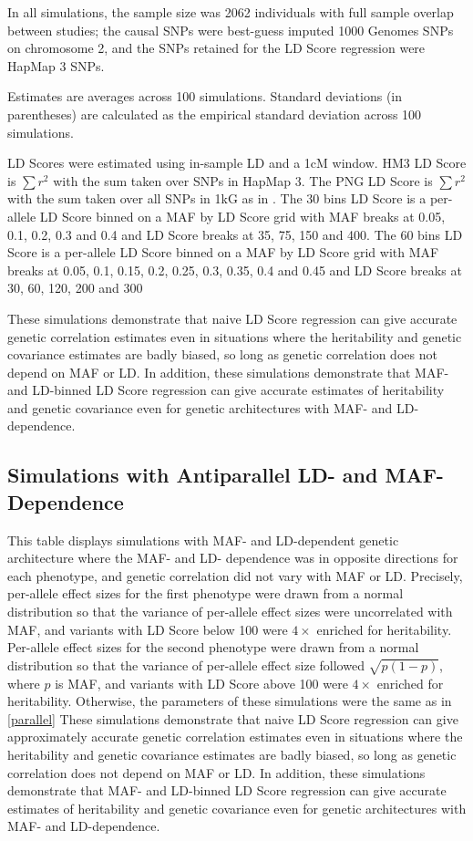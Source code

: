 \documentclass[11pt]{article}
\numberwithin{equation}{section}
\numberwithin{definition}{section}
\numberwithin{thm}{section}
\numberwithin{lemma}{section}
\numberwithin{prop}{section}
\numberwithin{cor}{section}
\numberwithin{hyp}{section}
\begin{document}
In all simulations, the sample size was 2062 individuals with full sample overlap between studies; the causal SNPs were best-guess imputed 1000 Genomes SNPs on chromosome 2, and the SNPs retained for the LD Score regression were HapMap 3 SNPs. 

Estimates are averages across 100 simulations. Standard deviations (in parentheses) are calculated as the empirical standard deviation across 100 simulations.

LD Scores were estimated using in-sample LD and a 1cM window. 
HM3 LD Score is $\sum r^2$ with the sum taken over SNPs in HapMap 3. 
The PNG LD Score is $\sum r^2$ with the sum taken over all SNPs in 1kG as in \cite{buliksullivan2014}. The 30 bins LD Score is a per-allele LD Score binned on a MAF by LD Score grid with MAF breaks at 0.05, 0.1, 0.2, 0.3 and 0.4 and LD Score breaks at 35, 75, 150 and 400. The 60 bins LD Score is a per-allele LD Score binned on a MAF by LD Score grid with MAF breaks at 0.05, 0.1, 0.15, 0.2, 0.25, 0.3, 0.35, 0.4 and 0.45 and LD Score breaks at 30, 60, 120, 200 and 300

These simulations demonstrate that naive LD Score regression can give accurate genetic correlation estimates even in situations where the heritability and genetic covariance estimates are badly biased, so long as genetic correlation does not depend on MAF or LD. In addition, these simulations demonstrate that MAF- and LD-binned LD Score regression can give accurate estimates of heritability and genetic covariance even for genetic architectures with MAF- and LD-dependence.

\newpage
\subsection{Simulations with Antiparallel LD- and MAF-Dependence}
\label{antiparallel}

This table displays simulations with MAF- and LD-dependent genetic architecture where the MAF- and LD- dependence was in opposite directions for each phenotype, and genetic correlation did not vary with MAF or LD. Precisely, per-allele effect sizes for the first phenotype were drawn from a normal distribution so that the variance of per-allele effect sizes were uncorrelated with MAF, and variants with LD Score below 100 were $4\times$ enriched for heritability. Per-allele effect sizes for the second phenotype were drawn from a normal distribution so that the variance of per-allele effect size followed $\sqrt{p(1-p)}$, where $p$ is MAF, and variants with LD Score above 100 were $4\times$ enriched for heritability. Otherwise, the parameters of these simulations were the same as in \ref{parallel}
These simulations demonstrate that naive LD Score regression can give approximately accurate genetic correlation estimates even in situations where the heritability and genetic covariance estimates are badly biased, so long as genetic correlation does not depend on MAF or LD. In addition, these simulations demonstrate that MAF- and LD-binned LD Score regression can give accurate estimates of heritability and genetic covariance even for genetic architectures with MAF- and LD-dependence.
\newpage
\end{document}
